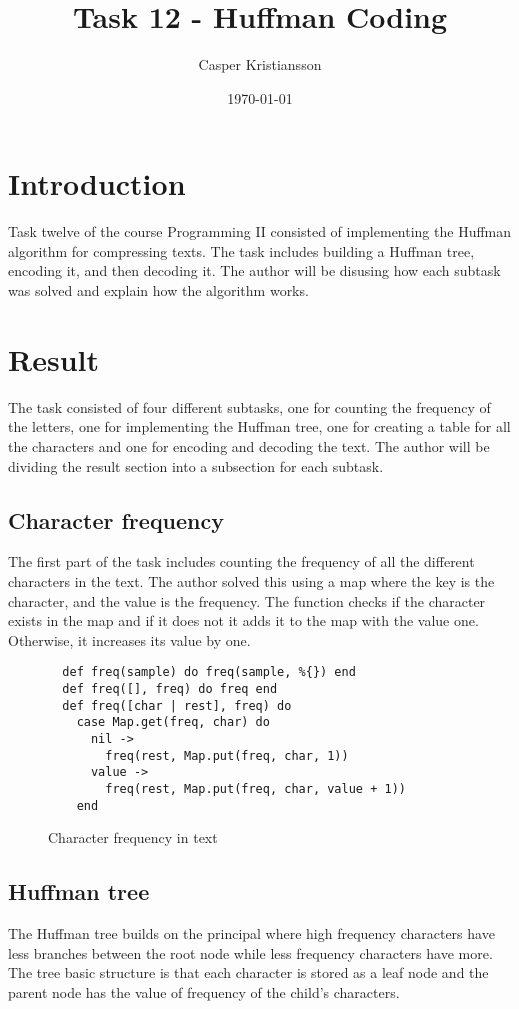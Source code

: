 \documentclass[a4paper,11pt]{article}
\begin{document}
\title{
    \textbf{Task 12 - Huffman Coding}
}
\author{Casper Kristiansson}
\date{\today}

\maketitle

\section*{Introduction}
Task twelve of the course Programming II consisted of implementing the Huffman algorithm for compressing texts. The task includes building a Huffman tree, encoding it, and then decoding it. The author will be disusing how each subtask was solved and explain how the algorithm works.

\section*{Result}
The task consisted of four different subtasks, one for counting the frequency of the letters, one for implementing the Huffman tree, one for creating a table for all the characters and one for encoding and decoding the text. The author will be dividing the result section into a subsection for each subtask.

\subsection*{Character frequency}
The first part of the task includes counting the frequency of all the different characters in the text. The author solved this using a map where the key is the character, and the value is the frequency. The function checks if the character exists in the map and if it does not it adds it to the map with the value one. Otherwise, it increases its value by one.

\begin{figure}[H]
\begin{verbatim}
  def freq(sample) do freq(sample, %{}) end
  def freq([], freq) do freq end
  def freq([char | rest], freq) do
    case Map.get(freq, char) do
      nil ->
        freq(rest, Map.put(freq, char, 1))
      value ->
        freq(rest, Map.put(freq, char, value + 1))
    end
\end{verbatim}
\caption{Character frequency in text}
\label{Figure:1}
\end{figure}

\subsection*{Huffman tree}
The Huffman tree builds on the principal where high frequency characters have less branches between the root node while less frequency characters have more. The tree basic structure is that each character is stored as a leaf node and the parent node has the value of frequency of the child's characters.
\end{document}

